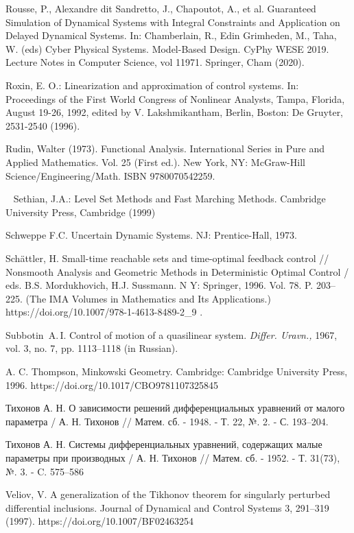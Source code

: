 \documentclass[../main.tex]{subfiles}
\begin{document}
\begin{thebibliography}{99}
Rousse, P., Alexandre dit Sandretto, J., Chapoutot, A., et al. Guaranteed Simulation of Dynamical Systems with Integral Constraints and Application on Delayed Dynamical Systems. In: Chamberlain, R., Edin Grimheden, M., Taha, W. (eds) Cyber Physical Systems. Model-Based Design. CyPhy WESE 2019. Lecture Notes in Computer Science, vol 11971. Springer, Cham (2020). 

Roxin, E. O.: Linearization and approximation of control systems. In: Proceedings of the First World Congress of Nonlinear Analysts, Tampa, Florida, August 19-26, 1992, edited by V. Lakshmikantham, Berlin, Boston: De Gruyter, 2531-2540 (1996). 

Rudin, Walter (1973). Functional Analysis. International Series in Pure and Applied Mathematics. Vol. 25 (First ed.). New York, NY: McGraw-Hill Science/Engineering/Math. ISBN 9780070542259.

Sethian, J.A.: Level Set Methods and Fast Marching Methods. Cambridge University Press,
Cambridge (1999)

Schweppe F.C. Uncertain Dynamic Systems. NJ: Prentice-Hall, 1973.

Sch\"{a}ttler, H. Small-time reachable sets and time-optimal feedback control // Nonsmooth Analysis and Geometric Methods in Deterministic Optimal Control / eds. B.S. Mordukhovich, H.J. Sussmann.
N Y: Springer, 1996. Vol. 78. P. 203–225. (The IMA Volumes in Mathematics and Its Applications.)
https://doi.org/10.1007/978-1-4613-8489-2\_9 .

Subbotin~A.\,I. Control of motion of a quasilinear system. \emph{Differ. Uravn.,} 1967, vol. 3, no. 7, pp. 1113–1118
(in Russian).

A. C. Thompson, Minkowski Geometry. Cambridge: Cambridge University Press, 1996. 
https://doi.org/10.1017/CBO9781107325845


Тихонов А. Н. О зависимости решений дифференциальных уравнений от малого параметра / А. Н. Тихонов // Матем. сб. - 1948. - Т. 22, №. 2. - С. 193–204.

Тихонов А. Н. Системы дифференциальных уравнений, содержащих малые параметры при производных / А. Н. Тихонов // Матем. сб. - 1952. - Т. 31(73), №.
3. - C. 575–586

Veliov, V. A generalization of the Tikhonov theorem for singularly perturbed differential inclusions. Journal of Dynamical and Control Systems 3, 291–319 (1997). https://doi.org/10.1007/BF02463254


\end{thebibliography}
\end{document}
